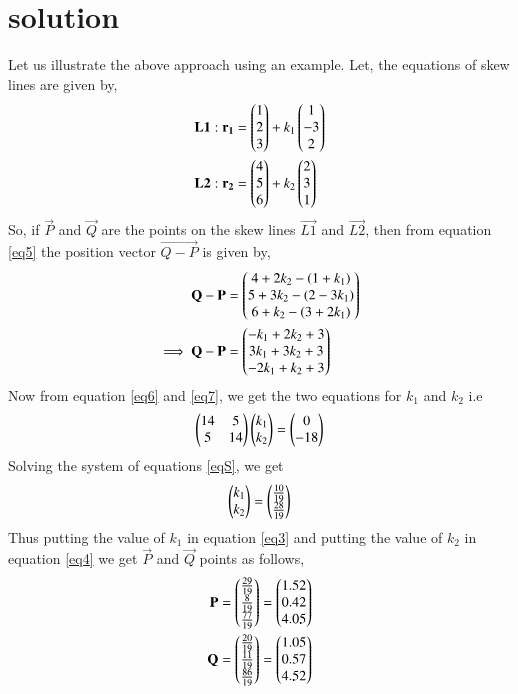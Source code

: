 \documentclass[journal,12pt,twocolumn]{IEEEtran}
\begin{document}
\section{solution}
Let us illustrate the above approach using an example. Let, the equations of skew lines are given by,
\begin{align}
\mathbf{L1}: \mathbf{r_1}&=\begin{pmatrix}1\\2\\3\end{pmatrix}+k_1\begin{pmatrix}1\\-3\\2\end{pmatrix}\label{eqL1}\\
\mathbf{L2}: \mathbf{r_2}&=\begin{pmatrix}4\\5\\6\end{pmatrix}+k_2\begin{pmatrix}2\\3\\1\end{pmatrix}\label{eqL2}
\end{align} 
So, if $\vec{P}$ and $\vec{Q}$ are the points on the skew lines $\vec{L1}$ and $\vec{L2}$, then from equation \ref{eq5} the position vector $\vec{Q-P}$ is given by,
\begin{align}
\mathbf{Q-P}&=\begin{pmatrix}4+2k_2-(1+k_1)\\5+3k_2-(2-3k_1)\\6+k_2-(3+2k_1)\end{pmatrix}\\
\implies\mathbf{Q-P}&=\begin{pmatrix}-k_1+2k_2+3\\3k_1+3k_2+3\\-2k_1+k_2+3\end{pmatrix}
\end{align}
Now from equation \ref{eq6} and \ref{eq7}, we get the two equations for $k_1$ and $k_2$ i.e
\begin{align}
\begin{pmatrix}14&5\\5&14\end{pmatrix}\begin{pmatrix}k_1\\k_2\end{pmatrix} = \begin{pmatrix}0\\-18\end{pmatrix}\label{eqS}
\end{align}
Solving the system of equations \ref{eqS}, we get 
\begin{align}
\begin{pmatrix}k_1\\k_2\end{pmatrix} = \begin{pmatrix}\frac{10}{19}\\\frac{28}{19}\end{pmatrix}
\end{align}
Thus putting the value of $k_1$ in equation \ref{eq3} and putting the value of $k_2$ in equation \ref{eq4} we get $\vec{P}$ and $\vec{Q}$ points as follows,
\begin{align}
\mathbf{P}&=\begin{pmatrix}\frac{29}{19}\\\frac{8}{19}\\\frac{77}{19}\end{pmatrix}=\begin{pmatrix}1.52\\0.42\\4.05\end{pmatrix}\\
\mathbf{Q}&=\begin{pmatrix}\frac{20}{19}\\\frac{11}{19}\\\frac{86}{19}\end{pmatrix}=\begin{pmatrix}1.05\\0.57\\4.52\end{pmatrix}
\end{align}
\end{document}

